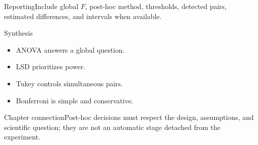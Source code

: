 \documentclass[10pt,aspectratio=169]{beamer}
\begin{document}
\begin{frame}{Reporting}\small Include global $F$, post-hoc method, thresholds, detected pairs, estimated differences, and intervals when available.\end{frame}
\begin{frame}{Synthesis}\small\begin{itemize}\item ANOVA answers a global question.\item LSD prioritizes power.\item Tukey controls simultaneous pairs.\item Bonferroni is simple and conservative.\end{itemize}\end{frame}
\begin{frame}{Chapter connection}\small Post-hoc decisions must respect the design, assumptions, and scientific question; they are not an automatic stage detached from the experiment.\end{frame}
\end{document}
